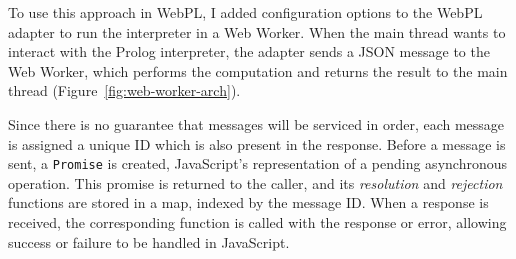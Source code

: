 \vspace*{-1.5em}

To use this approach in WebPL, I added configuration options to the WebPL adapter to run the interpreter in a Web Worker. When the main thread wants to interact with the Prolog interpreter, the adapter sends a JSON message to the Web Worker, which performs the computation and returns the result to the main thread (Figure~\ref{fig:web-worker-arch}).

Since there is no guarantee that messages will be serviced in order, each message is assigned a unique ID which is also present in the response. Before a message is sent, a \texttt{Promise} is created, JavaScript's representation of a pending asynchronous operation. This promise is returned to the caller, and its \emph{resolution} and \emph{rejection} functions are stored in a map, indexed by the message ID. When a response is received, the corresponding function is called with the response or error, allowing success or failure to be handled in JavaScript.